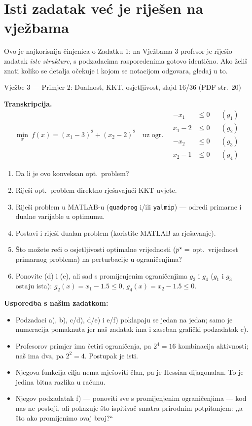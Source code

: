 \section{Isti zadatak već je riješen na vježbama}
\label{sec:z1-vjezbe3}

Ovo je najkorisnija činjenica o Zadatku 1: na Vježbama 3 profesor je riješio
zadatak \emph{iste strukture}, s podzadacima raspoređenima gotovo identično.
Ako želiš znati koliko se detalja očekuje i kojom se notacijom odgovara, gledaj
u to.

\begin{izvor}{Vježbe 3 --- Primjer 2: Dualnost, KKT, osjetljivost, slajd 16/36 (PDF str.~20)}

\textbf{Transkripcija.}
\[
\min_x \ f(x) = (x_1-3)^2 + (x_2-2)^2
\quad\text{uz ogr.}\quad
\begin{aligned}
-x_1 &\leq 0 && (g_1) \\
x_1 - 2 &\leq 0 && (g_2) \\
-x_2 &\leq 0 && (g_3) \\
x_2 - 1 &\leq 0 && (g_4)
\end{aligned}
\]
\begin{enumerate}[label=\alph*),nosep,leftmargin=*]
  \item Da li je ovo konveksan opt.\ problem?
  \item Riješi opt.\ problem direktno rješavajući KKT uvjete.
  \item Riješi problem u MATLAB-u (\texttt{quadprog} i/ili \texttt{yalmip}) ---
        odredi primarne i dualne varijable u optimumu.
  \item Postavi i riješi dualan problem (koristite MATLAB za rješavanje).
  \item Što možete reći o osjetljivosti optimalne vrijednosti ($p^{\star} =$ opt.\
        vrijednost primarnog problema) na perturbacije u ograničenjima?
  \item Ponovite (d) i (e), ali sad s promijenjenim ograničenjima $g_2$ i $g_4$
        ($g_1$ i $g_3$ ostaju ista): $g_2(x) = x_1 - 1.5 \leq 0$,
        $g_4(x) = x_2 - 1.5 \leq 0$.
\end{enumerate}

\textbf{Usporedba s našim zadatkom:}
\begin{itemize}[nosep,leftmargin=*]
  \item Podzadaci a), b), c/d), d/e) i e/f) poklapaju se jedan na jedan; samo je
        numeracija pomaknuta jer naš zadatak ima i zaseban grafički podzadatak c).
  \item Profesorov primjer ima četiri ograničenja, pa $2^4 = 16$ kombinacija
        aktivnosti; naš ima dva, pa $2^2 = 4$. Postupak je isti.
  \item Njegova funkcija cilja nema mješoviti član, pa je Hessian dijagonalan.
        To je jedina bitna razlika u računu.
  \item Njegov podzadatak f) --- ponoviti sve s promijenjenim ograničenjima ---
        kod nas ne postoji, ali pokazuje što ispitivač smatra prirodnim
        potpitanjem: ,,a što ako promijenimo ovaj broj?``
\end{itemize}
\end{izvor}

